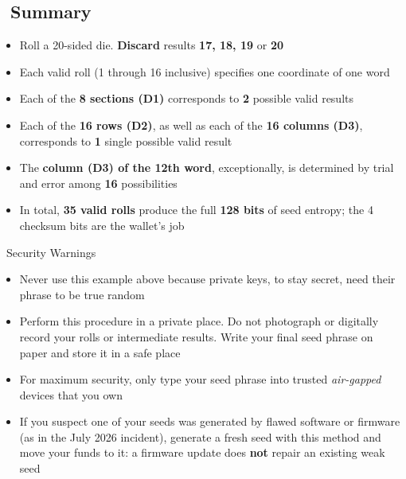 \documentclass[10pt]{article}
\begin{document}
\subsection*{\faListOl~Summary}

\begin{itemize}[itemsep=1pt]
 \item Roll a 20-sided die. \textbf{Discard} results \textbf{17, 18, 19} or \textbf{20}
 \item Each valid roll (1 through 16 inclusive) specifies one coordinate of one word
 \item Each of the \textbf{8 sections (D1)} corresponds to \textbf{2} possible valid results
 \item Each of the \textbf{16 rows (D2)}, as well as each of the \textbf{16 columns (D3)}, corresponds to \textbf{1} single possible valid result
 \item The \textbf{column (D3) of the 12th word}, exceptionally, is determined by trial and error among \textbf{16} possibilities
 \item In total, \textbf{35 valid rolls} produce the full \textbf{128 bits} of seed entropy; the 4 checksum bits are the wallet's job
\end{itemize}

\begin{warnbox}{\faExclamationTriangle~Security Warnings}
\begin{itemize}[itemsep=1pt]
 \item Never use this example above because private keys, to stay secret, need their phrase to be true random
 \item Perform this procedure in a private place. Do not photograph or digitally record your rolls or intermediate results. Write your final seed phrase on paper and store it in a safe place
 \item For maximum security, only type your seed phrase into trusted \textit{air-gapped} devices that you own
 \item If you suspect one of your seeds was generated by flawed software or firmware (as in the July 2026 incident), generate a fresh seed with this method and move your funds to it: a firmware update does \textbf{not} repair an existing weak seed
\end{itemize}
\end{warnbox}
\end{document}
